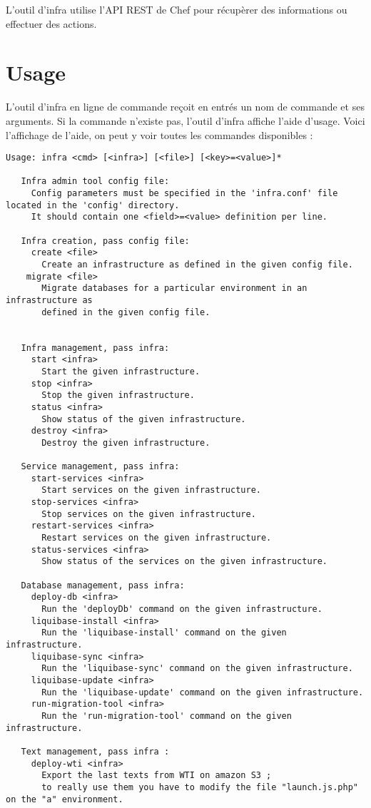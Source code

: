L'outil d'infra utilise l'API REST de Chef pour récupèrer des informations ou
effectuer des actions. 

\section{Usage}

L'outil d'infra en ligne de commande reçoit en entrés un nom de commande
et ses arguments. Si la commande n'existe pas, l'outil d'infra affiche l'aide
d'usage.
Voici l'affichage de l'aide, on peut y voir toutes les commandes disponibles :
\begin{verbatim}
Usage: infra <cmd> [<infra>] [<file>] [<key>=<value>]*

   Infra admin tool config file:
     Config parameters must be specified in the 'infra.conf' file located in the 'config' directory.
     It should contain one <field>=<value> definition per line.

   Infra creation, pass config file:
     create <file>
       Create an infrastructure as defined in the given config file.
    migrate <file>
       Migrate databases for a particular environment in an infrastructure as
       defined in the given config file.


   Infra management, pass infra:
     start <infra>
       Start the given infrastructure.
     stop <infra>
       Stop the given infrastructure.
     status <infra>
       Show status of the given infrastructure.
     destroy <infra>
       Destroy the given infrastructure.

   Service management, pass infra:
     start-services <infra>
       Start services on the given infrastructure.
     stop-services <infra>
       Stop services on the given infrastructure.
     restart-services <infra>
       Restart services on the given infrastructure.
     status-services <infra>
       Show status of the services on the given infrastructure.

   Database management, pass infra:
     deploy-db <infra>
       Run the 'deployDb' command on the given infrastructure.
     liquibase-install <infra>
       Run the 'liquibase-install' command on the given infrastructure.
     liquibase-sync <infra>
       Run the 'liquibase-sync' command on the given infrastructure.
     liquibase-update <infra>
       Run the 'liquibase-update' command on the given infrastructure.
     run-migration-tool <infra>
       Run the 'run-migration-tool' command on the given infrastructure.

   Text management, pass infra :
     deploy-wti <infra>
       Export the last texts from WTI on amazon S3 ; 
       to really use them you have to modify the file "launch.js.php" on the "a" environment.


\end{verbatim}
